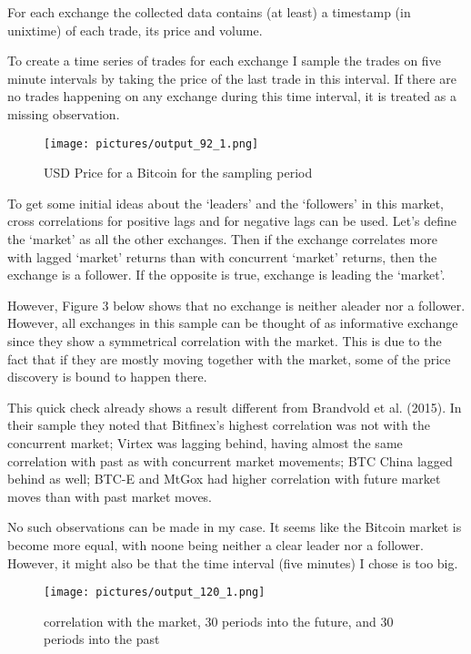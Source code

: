 \documentclass[a4paper,12pt]{article}
\begin{document}
    For each exchange the collected data contains (at least) a timestamp (in unixtime) of each trade, its price and volume.

    To create a time series of trades for each exchange I sample the trades on five minute intervals by taking the price of the last trade in this interval. If there are no trades happening on any exchange during this time interval, it is treated as a missing observation.

    \begin{figure}[h]
      \centering
      \texttt{[image: pictures/output\_92\_1.png]}
      \caption{USD Price for a Bitcoin for the sampling period}
    \end{figure}

    To get some initial ideas about the `leaders' and the `followers' in this market, cross correlations for positive lags and for negative lags can be used. Let's define the `market' as all the other exchanges. Then if the exchange correlates more with lagged `market' returns than with concurrent `market' returns, then the exchange is a follower. If the opposite is true, exchange is leading the `market'.

    However, Figure 3 below shows that no exchange is neither aleader nor a follower. However, all exchanges in this sample can be thought of as informative exchange since they show a symmetrical correlation with the market. This is due to the fact that if they are mostly moving together with the market, some of the price discovery is bound to happen there.

    This quick check already shows a result different from Brandvold et al. (2015). In their sample they noted that Bitfinex's highest correlation was not with the concurrent market; Virtex was lagging behind, having almost the same correlation with past as with concurrent market movements; BTC China lagged behind as well; BTC-E and MtGox had higher correlation with future market moves than with past market moves.

    No such observations can be made in my case. It seems like the Bitcoin market is become more equal, with noone being neither a clear leader nor a follower. However, it might also be that the time interval (five minutes) I chose is too big.

    \begin{figure}[h]
      \centering
      \texttt{[image: pictures/output\_120\_1.png]}
      \caption{correlation with the market, 30 periods into the future, and 30 periods into the past}
    \end{figure}
\end{document}
